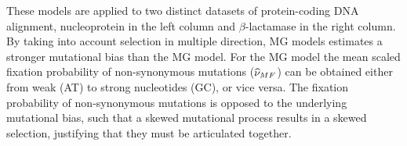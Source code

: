 \documentclass{article}
\begin{document}
\begin{table}[h]
{        These models are applied to two distinct datasets of protein-coding {DNA} alignment, nucleoprotein in the left column and $\beta$-lactamase in the right column.
        By taking into account selection in multiple direction, {MG} models estimates a stronger mutational bias than the {MG} model.
        For the {MG} model the mean scaled fixation probability of {non-synonymous} mutations ($\widehat{\nu}_{MF}$) can be obtained either from weak (AT) to strong nucleotides (GC), or vice versa.
        The fixation probability of {non-synonymous} mutations is opposed to the underlying mutational bias, such that a skewed mutational process results in a skewed selection, justifying that they must be articulated together.
    }
    \label{tab:mut-bias-estimation}
\end{table}
\end{document}
